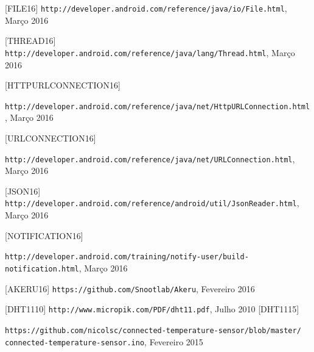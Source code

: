 \documentclass[a4paper]{article}
\begin{document}
\pagebreak
\begin{thebibliography}{9}

  [FILE16] \texttt{http://developer.android.com/reference/java/io/File.html}, Março 2016
  
  [THREAD16] \texttt{http://developer.android.com/reference/java/lang/Thread.html}, Março 2016
  
  [HTTPURLCONNECTION16] \begin{sloppypar} \texttt{http://developer.android.com/reference/java/net/HttpURLConnection.html}, Março 2016 \end{sloppypar}
  
  [URLCONNECTION16] \begin{sloppypar}\texttt{http://developer.android.com/reference/java/net/URLConnection.html}, Março 2016 \end{sloppypar}
  
  [JSON16] \texttt{http://developer.android.com/reference/android/util/JsonReader.html}, Março 2016
  
  [NOTIFICATION16] \begin{sloppypar}\texttt{http://developer.android.com/training/notify-user/build-notification.html}, Março 2016 \end{sloppypar}
  
  [AKERU16] \texttt{https://github.com/Snootlab/Akeru}, Fevereiro 2016
  
  [DHT1110] \texttt{http://www.micropik.com/PDF/dht11.pdf}, Julho 2010
  [DHT1115] \begin{sloppypar} \texttt{https://github.com/nicolsc/connected-temperature-sensor/blob/master/ \allowbreak connected-temperature-sensor.ino}, Fevereiro 2015  \end{sloppypar}


\end{thebibliography}
\end{document}
